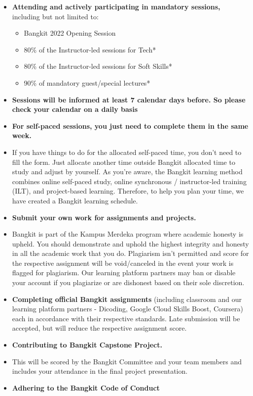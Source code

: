 {\begin{itemize}
    \item \textbf{Attending and actively participating in mandatory sessions,} including but not limited to:
        \begin{itemize}
            \item Bangkit 2022 Opening Session
            \item 80\% of the Instructor-led sessions for Tech* 
            \item 80\% of the Instructor-led sessions for Soft Skills*
            \item 90\% of mandatory guest/special lectures*
        \end{itemize}
    \item[] \textbf{Sessions will be informed at least 7 calendar days before. So please check your calendar on a daily basis}
    \item \textbf{For self-paced sessions, you just need to complete them in the same week.}
    \item[]If you have things to do for the allocated self-paced time, you don’t need to fill the form. Just allocate another time outside Bangkit allocated time to study and adjust by yourself. As you’re aware, the Bangkit learning method combines online self-paced study, online synchronous / instructor-led training (ILT), and project-based learning. Therefore, to help you plan your time, we have created a Bangkit learning schedule.
    \item \textbf{Submit your own work for assignments and projects.}
    \item[] Bangkit is part of the Kampus Merdeka program where academic honesty is upheld. You should demonstrate and uphold the highest integrity and honesty in all the academic work that you do. Plagiarism isn’t permitted and score for the respective assignment will be void/canceled in the event your work is flagged for plagiarism. Our learning platform partners may ban or disable your account if you plagiarize or are dishonest based on their sole discretion.
    \item \textbf{Completing official Bangkit assignments} (including classroom and our learning platform partners - Dicoding, Google Cloud Skills Boost, Coursera) each in accordance with their respective standards. Late submission will be accepted, but will reduce the respective assignment score.
    \item \textbf{Contributing to Bangkit Capstone Project.}
    \item[] This will be scored by the Bangkit Committee and your team members and includes your attendance in the final project presentation. 
    \item \textbf{Adhering to the Bangkit Code of Conduct}
\end{itemize}
}
